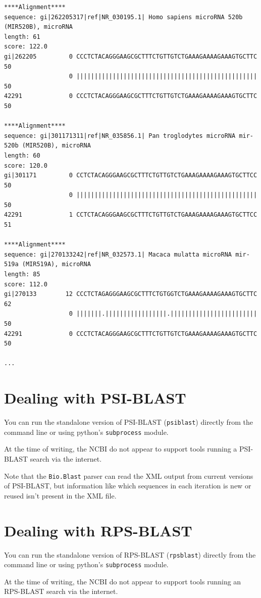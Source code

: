 \begin{verbatim}
****Alignment****
sequence: gi|262205317|ref|NR_030195.1| Homo sapiens microRNA 520b (MIR520B), microRNA
length: 61
score: 122.0
gi|262205         0 CCCTCTACAGGGAAGCGCTTTCTGTTGTCTGAAAGAAAAGAAAGTGCTTC 50
                  0 |||||||||||||||||||||||||||||||||||||||||||||||||| 50
42291             0 CCCTCTACAGGGAAGCGCTTTCTGTTGTCTGAAAGAAAAGAAAGTGCTTC 50

****Alignment****
sequence: gi|301171311|ref|NR_035856.1| Pan troglodytes microRNA mir-520b (MIR520B), microRNA
length: 60
score: 120.0
gi|301171         0 CCTCTACAGGGAAGCGCTTTCTGTTGTCTGAAAGAAAAGAAAGTGCTTCC 50
                  0 |||||||||||||||||||||||||||||||||||||||||||||||||| 50
42291             1 CCTCTACAGGGAAGCGCTTTCTGTTGTCTGAAAGAAAAGAAAGTGCTTCC 51

****Alignment****
sequence: gi|270133242|ref|NR_032573.1| Macaca mulatta microRNA mir-519a (MIR519A), microRNA
length: 85
score: 112.0
gi|270133        12 CCCTCTAGAGGGAAGCGCTTTCTGTGGTCTGAAAGAAAAGAAAGTGCTTC 62
                  0 |||||||.|||||||||||||||||.|||||||||||||||||||||||| 50
42291             0 CCCTCTACAGGGAAGCGCTTTCTGTTGTCTGAAAGAAAAGAAAGTGCTTC 50

...
\end{verbatim}

\section{Dealing with PSI-BLAST}

You can run the standalone version of PSI-BLAST (\verb|psiblast|) directly
from the command line or using python's \verb|subprocess| module.

At the time of writing, the NCBI do not appear to support tools running a
PSI-BLAST search via the internet.

Note that the \verb|Bio.Blast| parser can read the XML output from
current versions of PSI-BLAST, but information like which sequences in each
iteration is new or reused isn't present in the XML file.

\section{Dealing with RPS-BLAST}

You can run the standalone version of RPS-BLAST (\verb|rpsblast|) directly
from the command line or using python's \verb|subprocess| module.

At the time of writing, the NCBI do not appear to support tools running an
RPS-BLAST search via the internet.

